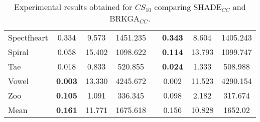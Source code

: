 \begin{table}[!h]
{\begin{tabular}{l ccc c ccc}
			Spectfheart & 0.334 & 9.573 & 1451.235 && \textbf{0.343} & 8.604 & 1405.243 \\
			Spiral & 0.058 & 15.402 & 1098.622 && \textbf{0.114} & 13.793 & 1099.747 \\
			Tae & 0.018 & 0.833 & 520.855 && \textbf{0.024} & 1.333 & 508.988 \\
			Vowel & \textbf{0.003} & 13.330 & 4245.672 && 0.002 & 11.523 & 4290.154 \\
			Zoo & \textbf{0.105} & 1.091 & 336.345 && 0.098 & 2.182 & 317.674 \\
			\hline
			Mean & \textbf{0.161} & 11.771 & 1675.618 && 0.156 & 10.828 & 1652.02 \\
			\hline
			
	\end{tabular}}
	
	\caption{Experimental results obtained for $CS_{10}$ comparing SHADE$_{CC}$ and BRKGA$_{CC}$.}
	\label{tab:results10}
\end{table}

